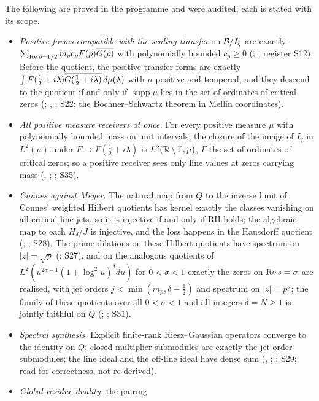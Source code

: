 The following are proved in the programme and were audited; each is stated with its scope.
\begin{itemize}
\item \emph{Positive forms compatible with the scaling transfer} on $\mathcal{B}/I_\zeta$ are exactly $\sum_{\operatorname{Re}\rho=1/2}m_\rho c_\rho F(\rho)\overline{G(\rho)}$ with polynomially bounded $c_\rho\ge0$ (; ; register S12). Before the quotient, the positive transfer forms are exactly $\int F(\tfrac12+i\lambda)\overline{G(\tfrac12+i\lambda)}\,d\mu(\lambda)$ with $\mu$ positive and tempered, and they descend to the quotient if and only if $\operatorname{supp}\mu$ lies in the set of ordinates of critical zeros (; , ; S22; the Bochner--Schwartz theorem in Mellin coordinates).
\item \emph{All positive measure receivers at once.} For every positive measure $\mu$ with polynomially bounded mass on unit intervals, the closure of the image of $I_\zeta$ in $L^2(\mu)$ under $F\mapsto F(\tfrac12+i\lambda)$ is $L^2(\mathbb{R}\setminus\Gamma,\mu)$, $\Gamma$ the set of ordinates of critical zeros; so a positive receiver sees only line values at zeros carrying mass (, ; ; S35).
\item \emph{Connes against Meyer.} The natural map from $Q$ to the inverse limit of Connes' weighted Hilbert quotients \cite{Connes} has kernel exactly the classes vanishing on all critical-line jets, so it is injective if and only if RH holds; the algebraic map to each $H_\delta/J$ is injective, and the loss happens in the Hausdorff quotient (; ; S28). The prime dilations on these Hilbert quotients have spectrum on $|z|=\sqrt p$ (; S27), and on the analogous quotients of $L^2(u^{2\sigma-1}(1+\log^2u)^\delta du)$ for $0<\sigma<1$ exactly the zeros on $\operatorname{Re} s=\sigma$ are realised, with jet orders $j<\min(m_\rho,\delta-\tfrac12)$ and spectrum on $|z|=p^\sigma$; the family of these quotients over all $0<\sigma<1$ and all integers $\delta=N\ge1$ is jointly faithful on $Q$ (; ; S31).
\item \emph{Spectral synthesis.} Explicit finite-rank Riesz--Gaussian operators converge to the identity on $Q$; closed multiplier submodules are exactly the jet-order submodules; the line ideal and the off-line ideal have dense sum (, ; ; S29; read for correctness, not re-derived).
\item \emph{Global residue duality.} the pairing

\end{itemize}
